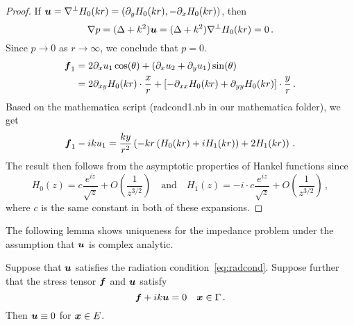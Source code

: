 \begin{proof}
If ${\boldsymbol u} = \nabla^{\perp} H_{0}(k r) = (\partial_{y} H_{0}(k r), 
-\partial_{x} H_{0}(k r))$, then
\begin{equation}
\nabla  p = (\Delta + k^2) {\boldsymbol u} = (\Delta + k^2) \nabla^{\perp} 
H_{0} (k r) = 0 \, .
\end{equation}
Since $p\to 0$ as $r\to \infty$, we conclude that $p=0$.
\begin{align}
{\boldsymbol f}_{1} &= 2\partial_{x} u_{1} \cos(\theta) + \left( \partial_{x} u_{2} + 
\partial_{y} u_{1} \right) \sin(\theta) \\
&= 2 \partial_{xy} H_{0}(k r) \cdot \frac{x}{r} +
\left[-\partial_{xx} H_{0}(k r) + \partial_{yy} H_{0}(k r) \right]
\cdot \frac{y}{r} \, .
\end{align}
Based on the mathematica script (radcond1.nb in our mathematica folder), we
get
\begin{equation}
{\boldsymbol f}_{1} - i k u_{1} = \frac{ky}{r^2} \left( -kr \left(H_{0}(k r) + 
i H_{1}(k r)\right) +
2 H_{1}(k r)\right) \, .
\end{equation}
The result then follows from the asymptotic properties of Hankel functions since
\begin{equation}
H_{0}(z) = c \frac{e^{iz}}{\sqrt{z}} + O(\frac{1}{z^{3/2}}) \quad 
\text{and} \quad 
H_{1}(z) = -i \cdot c \frac{e^{iz}}{\sqrt{z}} + O(\frac{1}{z^{3/2}}) \,,
\end{equation}
where $c$ is the same constant in both of these expansions.
\end{proof}

The following lemma shows uniqueness for the impedance problem under
the assumption that ${\boldsymbol u}$ is complex analytic.

\begin{lem}
Suppose that ${\boldsymbol u}$ satisfies the radiation
condition~\cref{eq:radcond}. 
Suppose further that the stress tensor ${\boldsymbol f}$ and ${\boldsymbol u}$ satisfy
\begin{equation}
{\boldsymbol f} + i k {\boldsymbol u} = 0 \quad {\boldsymbol x} \in \Gamma \, .
\end{equation}
Then ${\boldsymbol u} \equiv 0$ for ${\boldsymbol x} \in E$.
\end{lem}

